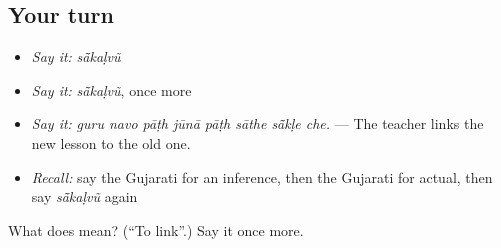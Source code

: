 \subsection*{Your turn}
\begin{itemize}
\raggedright
  \item \emph{Say it:} \emph{sā̃kaḷvũ}
  \item \emph{Say it:} \emph{sā̃kaḷvũ}, once more
  \item \emph{Say it:} \emph{guru navo pāṭh jūnā pāṭh sāthe sā̃kḷe che.} — The teacher links the new lesson to the old one.
  \item \emph{Recall:} say the Gujarati for an inference, then the Gujarati for actual, then say \emph{sā̃kaḷvũ} again
\end{itemize}

\begin{tcolorbox}[breakable,colback=teal!4,colframe=teal!35!black,title={Before you move on}]
What does  mean? (\textquotedblleft{}To link\textquotedblright{}.) Say it once more.
\end{tcolorbox}
